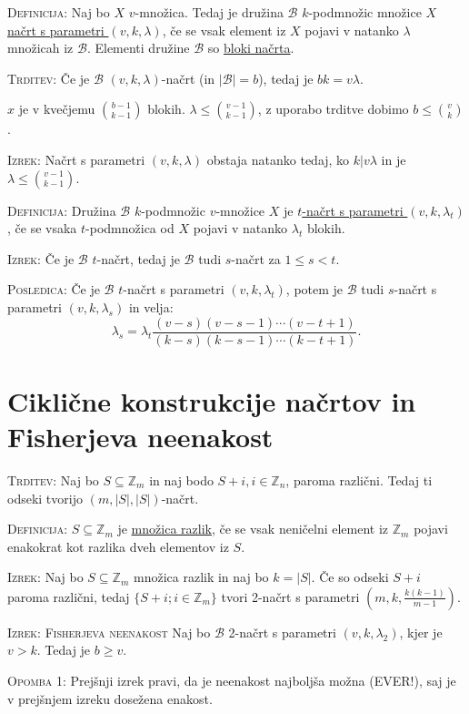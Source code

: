\documentclass[8pt,a4paper]{amsart}
\theoremstyle{definition} %
\theoremstyle{plain} %
\newcommand{\Z}{\mathbb Z}
\begin{document}
\textsc{Definicija:} Naj bo $X$ $v$-množica. Tedaj je družina $\mathcal{B}$ $k$-podmnožic množice $X$ \underline{načrt s parametri $(v,k,\lambda )$}, če se vsak element iz $X$ pojavi v natanko $\lambda$ množicah iz $\mathcal{B}$. Elementi družine $\mathcal{B}$ so \underline{bloki načrta}.

\textsc{Trditev:} Če je $\mathcal{B}$ $(v,k,\lambda)$-načrt (in $|\mathcal{B}|=b$), tedaj je $bk=v\lambda$.

$x$ je v kvečjemu $\binom{b-1}{k-1}$ blokih. $\lambda \leq \binom{v-1}{k-1}$, z uporabo trditve dobimo $b \leq \binom{v}{k}$.

\textsc{Izrek:} Načrt s parametri $(v,k,\lambda)$ obstaja natanko tedaj, ko $k | v\lambda$ in je $\lambda \leq \binom{v-1}{k-1}$.

\textsc{Definicija:} Družina $\mathcal{B}$ $k$-podmnožic $v$-množice $X$ je \underline{$t$-načrt s parametri $(v,k,\lambda_t)$}, če se vsaka $t$-podmnožica od $X$ pojavi v natanko $\lambda_t$ blokih.

\textsc{Izrek:} Če je $\mathcal{B}$ $t$-načrt, tedaj je $\mathcal{B}$ tudi $s$-načrt za $1 \leq s < t$.

\textsc{Posledica:} Če je $\mathcal{B}$ $t$-načrt s parametri $(v,k,\lambda_t)$, potem je $\mathcal{B}$ tudi $s$-načrt s parametri $(v,k,\lambda_s)$ in velja:
$$
\lambda_s = \lambda_t \frac{(v-s)(v-s-1)\cdots (v-t+1)}{(k-s)(k-s-1)\cdots (k-t+1)}.
$$

\section{Ciklične konstrukcije načrtov in Fisherjeva neenakost}

\textsc{Trditev:} Naj bo $S \subseteq \Z_m$ in naj bodo $S+i, i\in \Z_n$, paroma različni. Tedaj ti odseki tvorijo $(m,|S|,|S|)$-načrt.

\textsc{Definicija:} $S\subseteq \Z_m$ je \underline{množica razlik}, če se vsak neničelni element iz $\Z_m$ pojavi enakokrat kot razlika dveh elementov iz $S$.

\textsc{Izrek:} Naj bo $S \subseteq \Z_m$ množica razlik in naj bo $k=|S|$. Če so odseki $S+i$ paroma različni, tedaj $\{ S+i; i \in \Z_m \}$ tvori 2-načrt s parametri $(m,k,\frac{k(k-1)}{m-1})$.

\textsc{Izrek: Fisherjeva neenakost} Naj bo $\mathcal{B}$ 2-načrt s parametri $(v,k,\lambda_2)$, kjer je $v > k$. Tedaj je $b \geq v$.

\textsc{Opomba 1:} Prejšnji izrek pravi, da je neenakost najboljša možna (EVER!), saj je v prejšnjem izreku dosežena enakost.
\end{document}
